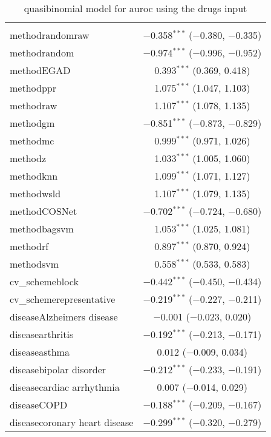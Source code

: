 
\begin{table}[!htbp] \centering 
  \caption{quasibinomial model for auroc using the drugs input} 
  \label{} 
\begin{tabular}{@{\extracolsep{5pt}}lc} 
\\[-1.8ex]\hline 
\hline \\[-1.8ex] 
 methodrandomraw & $-$0.358$^{***}$ ($-$0.380, $-$0.335) \\ 
  methodrandom & $-$0.974$^{***}$ ($-$0.996, $-$0.952) \\ 
  methodEGAD & 0.393$^{***}$ (0.369, 0.418) \\ 
  methodppr & 1.075$^{***}$ (1.047, 1.103) \\ 
  methodraw & 1.107$^{***}$ (1.078, 1.135) \\ 
  methodgm & $-$0.851$^{***}$ ($-$0.873, $-$0.829) \\ 
  methodmc & 0.999$^{***}$ (0.971, 1.026) \\ 
  methodz & 1.033$^{***}$ (1.005, 1.060) \\ 
  methodknn & 1.099$^{***}$ (1.071, 1.127) \\ 
  methodwsld & 1.107$^{***}$ (1.079, 1.135) \\ 
  methodCOSNet & $-$0.702$^{***}$ ($-$0.724, $-$0.680) \\ 
  methodbagsvm & 1.053$^{***}$ (1.025, 1.081) \\ 
  methodrf & 0.897$^{***}$ (0.870, 0.924) \\ 
  methodsvm & 0.558$^{***}$ (0.533, 0.583) \\ 
  cv\_schemeblock & $-$0.442$^{***}$ ($-$0.450, $-$0.434) \\ 
  cv\_schemerepresentative & $-$0.219$^{***}$ ($-$0.227, $-$0.211) \\ 
  diseaseAlzheimers disease & $-$0.001 ($-$0.023, 0.020) \\ 
  diseasearthritis & $-$0.192$^{***}$ ($-$0.213, $-$0.171) \\ 
  diseaseasthma & 0.012 ($-$0.009, 0.034) \\ 
  diseasebipolar disorder & $-$0.212$^{***}$ ($-$0.233, $-$0.191) \\ 
  diseasecardiac arrhythmia & 0.007 ($-$0.014, 0.029) \\ 
  diseaseCOPD & $-$0.188$^{***}$ ($-$0.209, $-$0.167) \\ 
  diseasecoronary heart disease & $-$0.299$^{***}$ ($-$0.320, $-$0.279) \\ 

\end{tabular}
\end{table}

